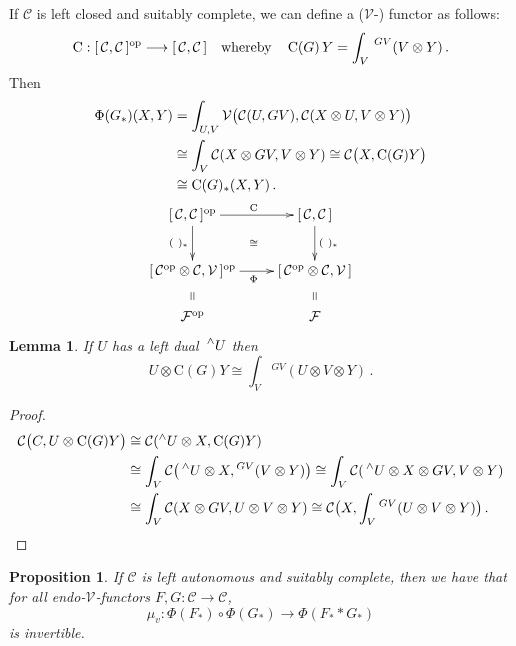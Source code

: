 \documentclass[a4paper,12pt]{article}
\newtheorem*{Proposition}{Proposition}
\newtheorem*{Lemma}{Lemma}%
\theoremstyle{definition}
\theoremstyle{fact}
\theoremstyle{genquest}
\theoremstyle{step}
\newcommand{\catC}{\mathcal{C}}
\newcommand{\funcC}{\mathrm{C}}
\newcommand{\catF}{\mathcal{F}}
\newcommand{\catV}{\mathcal{V}}
\newcommand{\op}{\operatorname{op}}
\newcommand{\longto}{\longrightarrow}
\newcommand{\ldual}[1]{\mathord{{\let\nolimits\relax\sideset{^\wedge}{}{#1}}}}
\newcommand{\laction}[2]{\mathord{{\let\nolimits\relax\sideset{^{#1}}{}{#2}}}}
\begin{document}
If $\catC$ is left closed and suitably complete, we can define a ($\catV$-) functor as follows:
\[
\funcC : [\,\catC,\catC\,]^{\op} \longto [\,\catC,\catC\,]
\quad\text{whereby}\quad %
\mathop{\funcC(G)} Y = \int_V\laction{GV}{(V\otimes Y)}\,.
\]
%
Then
\begin{align*}
\Phi (G_\ast) (X,Y) &=
\int_{U,V} \catV \bigl(\catC(U,GV),\catC(X\otimes U, V \otimes Y)\bigr)
\\
&\cong \int_V \catC (X\otimes GV,V\otimes Y)
   \cong \catC \bigl(X,\funcC(G)Y\bigr)
\\
&\cong \funcC (G)_\ast (X,Y)\,.
\\ &\kern-20pt
\xymatrix{\ar @{} [dr] |{\cong}
[\,\catC,\catC\,]^{\op}   \ar[r]^{\funcC}\ar[d]_{(\ )_\ast } & [\,\catC,\catC\,] \ar[d]^{(\ )_\ast } 
\\
[\,\catC^{\op} \otimes \catC,\catV\,]^{\op} \ar[r]_\Phi \ar @{} [d]|*@{=}
 & [\,\catC^{\op} \otimes \catC,\catV\,] \ar@{} [d] |*@{=}
\\
*!D{\catF^{\op} }&*!D{\catF}
} \end{align*}


\begin{Lemma}
If $U$ has a left dual $\ldual{U}$ then
\[
U \otimes \funcC (G) Y \cong \int_V {}^{GV} (U \otimes V \otimes Y)\,.
\]
\end{Lemma}

\begin{proof} 
\begin{align*}
\catC \bigl(C,U\otimes \funcC (G)Y\bigr) &\cong \catC (^\wedge U \otimes X, \funcC (G) Y)
\\
&\cong \int_V \catC \bigl({}\ldual{U}\otimes X, {}^{GV}(V\otimes Y)\bigr)
  \cong \int_V \catC ({}\ldual{U} \otimes X \otimes GV,V\otimes Y)
\\
&\cong \int_V \catC (X\otimes GV,U\otimes V \otimes Y) \cong \catC \bigl(X,\int_V {}^{GV}(U\otimes V\otimes Y)\bigr)\,. 
\end{align*}
\end{proof}

\begin{Proposition}
If $\catC$ is left autonomous and suitably complete, then we have that for all endo-$\catV$-functors $F,G:\catC \longto \catC$,
\[
\mu_v : \Phi (F_\ast) \circ \Phi (G_\ast) \to \Phi (F_\ast \ast G_\ast)
\]
is invertible.
\end{Proposition}
\end{document}
